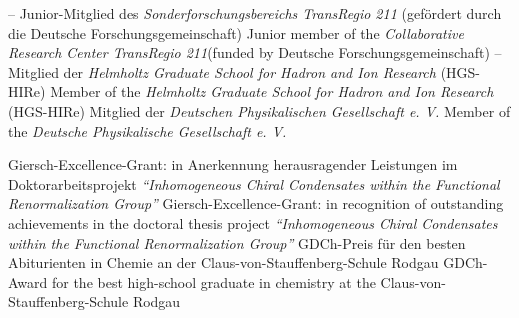\documentclass[color=TUDa-1b]{komacv}
\begin{document}
\cvitem%
	{}%
	{}



\cvitem%
	{--}%
	{\lang%
		{Junior-Mitglied des \textit{Sonderforschungsbereichs TransRegio 211} \newline (gefördert durch die Deutsche Forschungsgemeinschaft)}%
		{Junior member of the \textit{Collaborative Research Center TransRegio 211}\newline (funded by Deutsche Forschungsgemeinschaft)}
	}
\cvitem%
	{--}%
	{\lang%
		{Mitglied der \textit{Helmholtz Graduate School for Hadron and Ion Research} (HGS-HIRe)}
		{Member of the \textit{Helmholtz Graduate School for Hadron and Ion Research} (HGS-HIRe)}
	}
\cvitem%
	{ }%
	{\lang%
		{Mitglied der \textit{Deutschen Physikalischen Gesellschaft e. V.}}%
		{Member of the \textit{Deutsche Physikalische Gesellschaft e. V.}}
	}



\cvitem%
	{}%
	{\lang%
		{Giersch-Excellence-Grant: in Anerkennung herausragender Leistungen im Doktorarbeitsprojekt \textit{``Inhomogeneous Chiral Condensates within the Functional Renormalization Group''}}
		{Giersch-Excellence-Grant: in recognition of outstanding achievements in the doctoral thesis project \textit{``Inhomogeneous Chiral Condensates within the Functional Renormalization Group''}}
	}
\cvitem%
	{}
	{\lang%
		{GDCh-Preis für den besten Abiturienten in Chemie an der Claus-von-Stauffenberg-Schule Rodgau}
		{GDCh-Award for the best high-school graduate in chemistry at the Claus-von-Stauffenberg-Schule Rodgau}
	}
\end{document}
